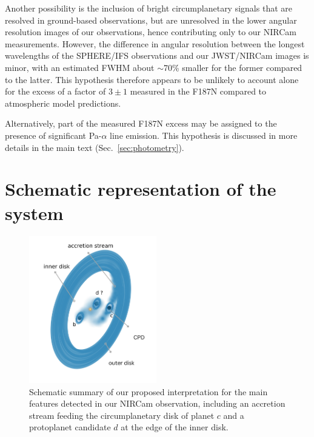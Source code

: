 \documentclass[longauth]{aa}
\begin{document}
\begin{appendix}
Another possibility is the inclusion of bright circumplanetary signals that are resolved in ground-based observations, but are unresolved in the lower angular resolution images of our observations, hence contributing only to our NIRCam measurements. However, the difference in angular resolution between the longest wavelengths of the SPHERE/IFS observations and our JWST/NIRCam images is minor, with an estimated FWHM about $\sim$70\% smaller for the former compared to the latter. This hypothesis therefore appears to be unlikely to account alone for the excess of a factor of $3 \pm 1$ measured in the F187N compared to atmospheric model predictions.  


Alternatively, part of the measured F187N excess may be assigned to the presence of significant Pa-$\alpha$ line emission. This hypothesis is discussed in more details in the main text (Sec.~\ref{sec:photometry}).


\section{Schematic representation of the system}

    \begin{figure}[h]
    \centering
    \includegraphics[width=0.495\textwidth]{FigG_v2.png}
    \caption{Schematic summary of our proposed interpretation for the main features detected in our NIRCam observation, including an accretion stream feeding the circumplanetary disk of planet $c$ and a protoplanet candidate $d$ at the edge of the inner disk.}
    \label{fig:schema}
    \end{figure}
    

\end{appendix}
\end{document}
